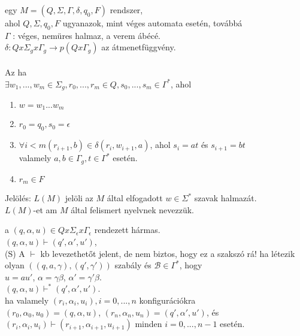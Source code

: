 \begin{frame}
\begin{tcolorbox}[title={Def.: Veremautomata, Elfgadott szó}]
 egy $M = (Q, {\Sigma}, {\Gamma}, {\delta}, q_0, F)$ rendszer,\\
ahol $Q, {\Sigma}, q_0, F$ ugyanazok, mint véges automata esetén, továbbá\\
\mmedskip
$\Gamma$ : véges, nemüres halmaz, a verem ábécé.\\
$\delta : Q x {\Sigma}_g x {\Gamma}_g \rightarrow p(Q x {\Gamma}_g)$ az átmenetfüggvény.\\
\mbigskip
{}\\
Az  ha\\
${\exists}w_1, ..., w_m \in {\Sigma}_g, r_0, ..., r_m \in Q, s_0, ..., s_m \in {\Gamma}^*$, ahol\\
\begin{enumerate}
\item $w = w_1...w_m$\\
\item $r_0 = q_0, s_0 = \epsilon$
\item ${\forall}i < m (r_{i + 1}, b) \in {\delta}(r_i, w_{i + 1}, a)$, ahol $s_i = at$ és $s_{i + 1} = bt$\\
valamely $a, b \in {\Gamma}_g, t \in {\Gamma}^*$ esetén.
\item $r_m \in F$
\end{enumerate}
\mmedskip
Jelölés: $L(M)$ jelöli az $M$ által elfogadott $w \in {\Sigma}^*$ szavak halmazát.\\
$L(M)$-et am $M$ által felismert nyelvnek nevezzük.
\end{tcolorbox}
\end{frame}

\begin{frame}
\begin{tcolorbox}[title={Def.: Konfiguráció}]
 a $(q, {\alpha}, u) \in Q x {\Sigma}_{\epsilon} x {\Gamma}_{\epsilon}$ rendezett hármas.\\
\mmedskip
$(q, {\alpha}, u) \vdash (q', {\alpha}', u')$,\\
{\tiny (S) A $\vdash$ kb levezethetőt jelent, de nem biztos, hogy ez a szakszó rá!}
\mmedskip
ha létezik olyan $((q, a, {\gamma}), (q', {\gamma}'))$ szabály és $\mathcal{B} \in {\Gamma}^*$, hogy\\
\mmedskip
$u = au'$, $\alpha = {\gamma}{\beta}$, ${\alpha}' = {\gamma}'{\beta}$.\\
\mmedskip
$(q, {\alpha}, u) {\vdash}^* (q', {\alpha}', u')$.\\
\mmedskip
ha valamely $(r_i, {\alpha}_i, u_i), i = 0, ..., n$ konfigurációkra\\
\mmedskip
$(r_0, {\alpha}_0, u_0) = (q, {\alpha}, u)$, $(r_n, {\alpha}_n, u_n) = (q', {\alpha}', u')$, és\\
$(r_i, {\alpha}_i, u_i) \vdash (r_{i + 1}, {\alpha}_{i + 1}, u_{i + 1})$ minden $i = 0, ..., n - 1$ esetén.\\
\end{tcolorbox}
\end{frame}

